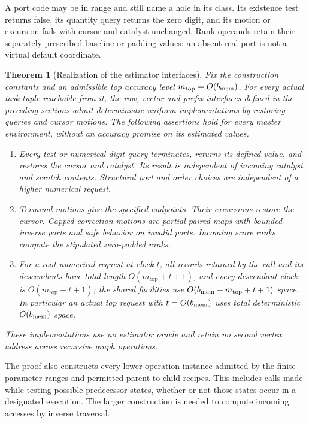 \documentclass[11pt]{article}
\numberwithin{equation}{section}
\newtheorem{theorem}{Theorem}[section]
\theoremstyle{definition}
\theoremstyle{remark}
\begin{document}
A port code may be in range and still name a hole in its class.  Its
existence test returns false, its quantity query returns the zero digit,
and its motion or excursion fails with cursor and catalyst unchanged.
Rank operands retain their separately prescribed baseline or padding
values: an absent real port is not a virtual default coordinate.

\begin{theorem}[Realization of the estimator interfaces]\label{thm:ctrl-realization}
Fix the construction constants and an admissible top accuracy level
${m}_{\mathrm{top}}=O({b_{\rm mem}})$.  For every actual task tuple reachable from it,
the row, vector and prefix interfaces defined in the preceding sections
admit deterministic uniform implementations by restoring queries and
cursor motions.
The following assertions hold for every master environment, without an
accuracy promise on its estimated values.
\begin{enumerate}
\item Every test or numerical digit query terminates, returns its
  defined value, and restores the cursor and catalyst.  Its result is
  independent of incoming catalyst and scratch contents.  Structural
  port and order choices are independent of a higher numerical request.
\item Terminal motions give the specified endpoints.  Their excursions
  restore the cursor.  Capped correction motions are partial paired
  maps with bounded inverse ports and safe behavior on invalid ports.
  Incoming score ranks compute the stipulated zero-padded ranks.
\item For a root numerical request at clock $t$, all records retained by the
  call and its descendants have total length $O({m}_{\mathrm{top}}+t+1)$,
  and every descendant clock is $O({m}_{\mathrm{top}}+t+1)$; the shared
  facilities use $O({b_{\rm mem}}+{m}_{\mathrm{top}}+t+1)$ space.  In particular an
  actual top request with $t=O({b_{\rm mem}})$ uses total deterministic $O({b_{\rm mem}})$ space.
\end{enumerate}
These implementations use no estimator oracle and retain no second
vertex address across recursive graph operations.
\end{theorem}

The proof also constructs every lower operation instance admitted by the
finite parameter ranges and permitted parent-to-child recipes.  This
includes calls made while testing possible predecessor states, whether
or not those states occur in a designated execution.  The larger
construction is needed to compute incoming accesses by inverse traversal.
\end{document}
